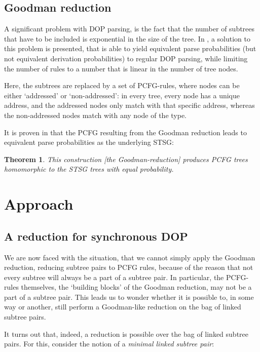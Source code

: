 \documentclass[a4paper]{article}
\newtheorem{theorem}{Theorem}[section]
\theoremstyle{definition}
\begin{document}
{{\subsection{Goodman reduction}

A significant problem with DOP parsing, is the fact that the number of subtrees
that have to be included is exponential in the size of the tree. In \cite{Go},
a solution to this problem is presented, that is able to yield equivalent parse
probabilities (but not equivalent derivation probabilities) to regular DOP
parsing, while limiting the number of rules to a number that is linear in the
number of tree nodes.

Here, the subtrees are replaced by a set of PCFG-rules, where nodes can be
either `addressed' or `non-addressed': in every tree, every node has a unique
address, and the addressed nodes only match with that specific address, whereas
the non-addressed nodes match with any node of the type.

It is proven in \cite{Go} that the PCFG resulting from the Goodman reduction
leads to equivalent parse probabilities as the underlying STSG:

\begin{theorem}
This construction [the Goodman-reduction] produces PCFG trees homomorphic to
the STSG trees with equal probability.
\end{theorem}

\section{Approach}

\subsection{A reduction for synchronous DOP}

We are now faced with the situation, that we cannot simply apply the Goodman
reduction, reducing subtree pairs to PCFG rules, because of the reason that not
every subtree will always be a part of a subtree pair. In particular, the
PCFG-rules themselves, the `building blocks' of the Goodman reduction, may not
be a part of a subtree pair. This leads us to wonder whether it is possible to,
in some way or another, still perform a Goodman-like reduction on the bag of
linked subtree pairs.

It turns out that, indeed, a reduction is possible over the bag of linked
subtree pairs. For this, consider the notion of a \emph{minimal linked subtree
pair}:

}}
\end{document}
